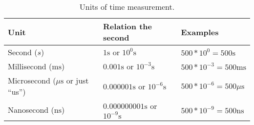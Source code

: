 \documentclass[../sparc.tex]{subfiles}
\begin{document}
\begin{table}[H]
  \begin{tabular}{p{3cm}|p{4cm}|p{3cm}}
    Unit & Relation the second & Examples \\
    \hline \hline
    Second ($s$)
    & $ 1 \mbox{s} $ or $ 10^0 \mbox{s} $
    & $ 500 * 10^{0} = 500 \mbox{s} $ \\
    \hline
    Millisecond ($\mbox{ms}$)
    & $ 0.001 \mbox{s} $ or $ 10^{-3} \mbox{s} $
    & $ 500 * 10^{-3} = 500 \mbox{ms} $ \\
    \hline
    Microsecond ($\mu\mbox{s}$ or just ``us'')
    & $ 0.000001 \mbox{s} $ or $ 10^{-6} \mbox{s} $
    & $ 500 * 10^{-6} = 500 \mu\mbox{s} $ \\
    \hline
    Nanosecond ($\mbox{ns}$)
    & $ 0.000000001 \mbox{s} $ or $ 10^{-9} \mbox{s} $
    & $ 500 * 10^{-9} = 500 \mbox{ns} $
  \end{tabular}
  \caption{Units of time measurement.}
  \label{table:timescale-units}
\end{table}
\end{document}
